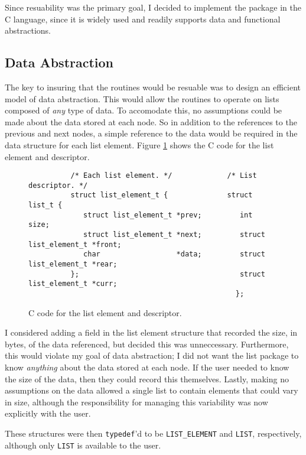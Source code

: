 \documentclass[fullpage,11pt]{article}
\begin{document}
Since resuability was the primary goal, I decided to implement the package in
the C language, since it is widely used and readily supports data and
functional abstractions.

\subsection{Data Abstraction}
The key to insuring that the routines would be resuable was to design an
efficient model of data abstraction.  This would allow the routines to operate
on lists composed of {\em any} type of data.  To accomodate this, no
assumptions could be made about the data stored at each node.  So in addition
to the references to the previous and next nodes, a simple reference to the
data would be required in the data structure for each list element.  Figure
\ref{ds} shows the C code for the list element and descriptor.

\begin{figure}[t]
\begin{verbatim}
          /* Each list element. */             /* List descriptor. */          
          struct list_element_t {              struct list_t {
             struct list_element_t *prev;         int                   size;
             struct list_element_t *next;         struct list_element_t *front;
             char                  *data;         struct list_element_t *rear;
          };                                      struct list_element_t *curr;
                                                 };
\end{verbatim}
\caption{C code for the list element and descriptor.}
\label{ds}
\end{figure}

I considered adding a field in the list element structure that recorded the
size, in bytes, of the data referenced, but decided this was unneccessary.
Furthermore, this would violate my goal of data abstraction; I did not want
the list package to know {\em anything} about the data stored at each node.
If the user needed to know the size of the data, then they could record this
themselves.  Lastly, making no assumptions on the data allowed a single list
to contain elements that could vary in size, although the responsibility for
managing this variability was now explicitly with the user.

These structures were then {\tt typedef}'d to be {\tt LIST\_ELEMENT} and
{\tt LIST}, respectively, although only {\tt LIST} is available to the user.
\end{document}

